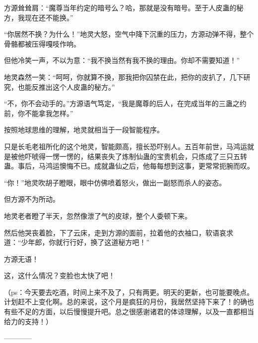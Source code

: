 \begin{this_body}
方源耸耸肩：“魔尊当年约定的暗号么？哈，那就是没有暗号。至于人皮蛊的秘方，我现在还不能换。”

“你居然不换？为什么！”地灵大怒，空气中降下沉重的压力，方源动弹不得，整个骨骼都被压得嘎吱作响。

但他冷笑一声，不以为意：“我不换当然有我不换的理由。你却不需要知道！”

地灵森然一笑：“呵呵，你就算不换，那我把你囚禁在此，把你的皮扒了，几下研究，也能反推出这个人皮蛊的秘方。”

“不，你不会动手的。”方源语气笃定，“我是魔尊的后人，在完成当年的三蛊之约前，你不能拿我怎样。”

按照地球思维的理解，地灵就相当于一段智能程序。

只是长毛老祖所化的这个地灵，智能颇高，擅长恐吓别人。五百年前世，马鸿运就是被他吓唬得一愣一愣的，结果丧失了炼制仙蛊的宝贵机会，只炼成了三只五转蛊。事后，马鸿运懊悔不已。成就蛊仙之后，他每每想到这事，更常常扼腕而叹。

“你！”地灵吹胡子瞪眼，眼中仿佛喷着怒火，做出一副怒而杀人的姿态。

但方源不为所动。

地灵老者瞪了半天，忽然像泄了气的皮球，整个人委顿下来。

然后他哭丧着脸，下了云床，走到方源的面前，拉着他的衣袖口，软语哀求道：“少年郎，你就行行好，换了这道秘方吧！”

方源无语！

这，这什么情况？变脸也太快了吧！

（ps：今天要去吃酒，时间上来不及了，只有两更。明天的更新，也可能要晚点。计划赶不上变化啊。总的来说，这个月是疯狂的月份，我居然坚持下来了！的确也有些不足的方面，以后慢慢提升吧。总之很感谢诸君的体谅理解，以及一直都相当给力的支持！）

------------

\end{this_body}

